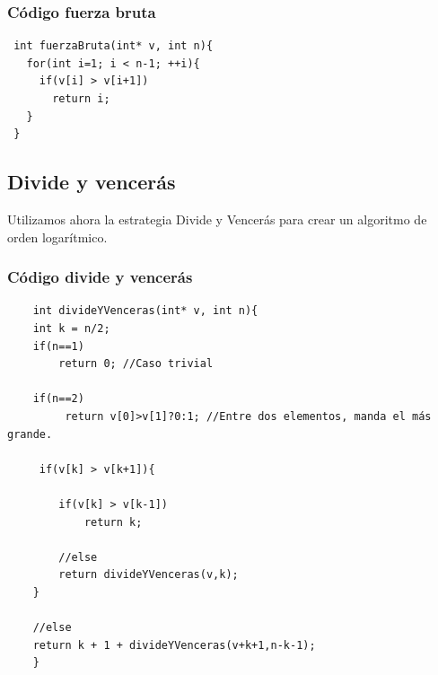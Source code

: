 \documentclass[compress]{beamer}
\begin{document}
\begin{frame}[fragile]
	\frametitle{Código fuerza bruta}
 \begin{lstlisting}
 int fuerzaBruta(int* v, int n){
   for(int i=1; i < n-1; ++i){
     if(v[i] > v[i+1])
       return i;
   }
 }
 \end{lstlisting}
\end{frame}

\subsection{Divide y vencerás}
\begin{frame}
        Utilizamos ahora la estrategia Divide y Vencerás para crear un algoritmo
de orden logarítmico.\\

\end{frame}
\newlength\someheight
\setlength\someheight{3.5cm}

\begin{frame}[fragile]
\frametitle{Código divide y vencerás}
\begin{center}
 \begin{adjustbox}{width=\textwidth,height=\someheight,keepaspectratio}
 	\begin{lstlisting}
 	int divideYVenceras(int* v, int n){
 	int k = n/2;
 	if(n==1)
	 	return 0; //Caso trivial
 	
 	if(n==2)
	 	 return v[0]>v[1]?0:1; //Entre dos elementos, manda el más grande.
 	
	 if(v[k] > v[k+1]){

 		if(v[k] > v[k-1]) 
	 		return k;
 		
	 	//else
 		return divideYVenceras(v,k);
 	}
 		
 	//else
 	return k + 1 + divideYVenceras(v+k+1,n-k-1);
 	}
 		\end{lstlisting}
 		\end{adjustbox}
 		\end{center}
 		
\end{frame}
\end{document}
